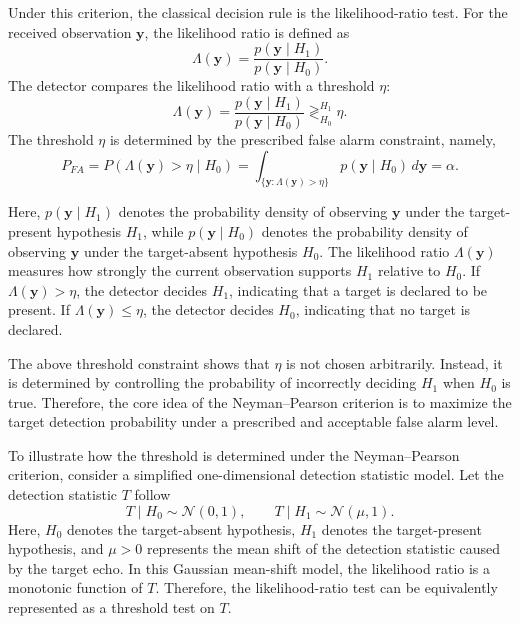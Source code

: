Under this criterion, the classical decision rule is the likelihood-ratio test.
For the received observation \(\mathbf{y}\), the likelihood ratio is defined as
\begin{equation}
    \Lambda(\mathbf{y})
    =
    \frac{p(\mathbf{y}\mid H_1)}
         {p(\mathbf{y}\mid H_0)}.
    \label{eq:likelihood_ratio}
\end{equation}
The detector compares the likelihood ratio with a threshold \(\eta\):
\begin{equation}
    \Lambda(\mathbf{y})
    =
    \frac{p(\mathbf{y}\mid H_1)}
         {p(\mathbf{y}\mid H_0)}
    \mathop{\gtrless}_{H_0}^{H_1}
    \eta.
    \label{eq:np_likelihood_ratio_test}
\end{equation}
The threshold \(\eta\) is determined by the prescribed false alarm constraint,
namely,
\begin{equation}
    P_{FA}
    =
    P\left(\Lambda(\mathbf{y})>\eta\mid H_0\right)
    =
    \int_{\{\mathbf{y}:\Lambda(\mathbf{y})>\eta\}}
    p(\mathbf{y}\mid H_0)\,d\mathbf{y}
    =
    \alpha.
    \label{eq:np_false_alarm_constraint}
\end{equation}

Here, \(p(\mathbf{y}\mid H_1)\) denotes the probability density of observing
\(\mathbf{y}\) under the target-present hypothesis \(H_1\), while
\(p(\mathbf{y}\mid H_0)\) denotes the probability density of observing
\(\mathbf{y}\) under the target-absent hypothesis \(H_0\).
The likelihood ratio \(\Lambda(\mathbf{y})\) measures how strongly the current
observation supports \(H_1\) relative to \(H_0\).
If \(\Lambda(\mathbf{y})>\eta\), the detector decides \(H_1\), indicating that
a target is declared to be present.
If \(\Lambda(\mathbf{y})\leq\eta\), the detector decides \(H_0\), indicating
that no target is declared.

The above threshold constraint shows that \(\eta\) is not chosen arbitrarily.
Instead, it is determined by controlling the probability of incorrectly
deciding \(H_1\) when \(H_0\) is true.
Therefore, the core idea of the Neyman--Pearson criterion is to maximize the
target detection probability under a prescribed and acceptable false alarm
level.

To illustrate how the threshold is determined under the Neyman--Pearson
criterion, consider a simplified one-dimensional detection statistic model.
Let the detection statistic \(T\) follow
\begin{equation}
    T\mid H_0 \sim \mathcal{N}(0,1),
    \qquad
    T\mid H_1 \sim \mathcal{N}(\mu,1).
    \label{eq:np_gaussian_statistic_model}
\end{equation}
Here, \(H_0\) denotes the target-absent hypothesis, \(H_1\) denotes the
target-present hypothesis, and \(\mu>0\) represents the mean shift of the
detection statistic caused by the target echo.
In this Gaussian mean-shift model, the likelihood ratio is a monotonic function
of \(T\).
Therefore, the likelihood-ratio test can be equivalently represented as a
threshold test on \(T\).

